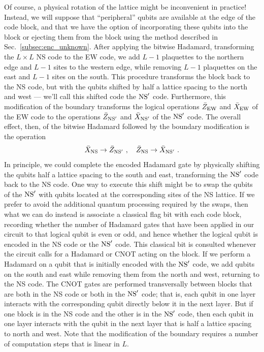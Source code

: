 Of course, a physical rotation of the lattice might be inconvenient in practice! Instead, we will  suppose that ``peripheral'' qubits are available at the edge of the code block, and that we have the option of incorporating these qubits into the block or ejecting them from the block using the  method described in Sec.~\ref{subsec:enc_unknown}. After applying the bitwise Hadamard, transforming the $L\times L$ NS code to the EW code, we add $L-1$ plaquettes to the northern edge and $L-1$ sites to the western edge, while removing $L-1$ plaquettes on the east and $L-1$ sites on the south. This procedure transforms the block back to the NS code, but with the qubits shifted by half a lattice spacing to the north and west --- we'll call this shifted code the ${\rm NS}'$ code. Furthermore, this modification of the boundary transforms the logical operations $\bar Z_{\rm EW}$ and $\bar X_{\rm EW}$ of the EW code to the operations $\bar Z_{{\rm NS}'}$ and $\bar X_{{\rm NS}'}$ of the ${\rm NS}'$ code. The overall effect, then, of the bitwise Hadamard followed by the boundary modification is the operation
\begin{equation}
\bar X_{\rm NS}\to \bar Z_{{\rm NS}'}~,\quad  \bar Z_{\rm NS}\to \bar X_{{\rm NS}'}~.
\end{equation}
In principle, we could complete the encoded Hadamard gate by physically shifting the qubits half a lattice spacing to the south and east, transforming the ${\rm NS}'$ code back to the NS code. One way to execute this shift might be to swap the qubits of the ${\rm NS}'$ with qubits located at the corresponding sites of the NS lattice. If we prefer to avoid the additional quantum processing required by the swaps, then what we can do instead is associate a classical flag bit with each code block, recording whether the number of Hadamard gates that have been applied in our circuit to that logical qubit is even or odd, and hence whether the logical qubit is encoded in the NS code or the ${\rm NS}'$ code. This classical bit is consulted whenever the circuit calls for a Hadamard or CNOT acting on the block. 
If we perform a Hadamard on a qubit that is initially encoded with the ${\rm NS}'$ code, we add qubits on the south and east while removing them from the north and west, returning to the NS code. The CNOT gates are performed transversally between blocks that are both in the NS code or both in the ${\rm NS}'$ code; that is, each qubit in one layer interacts with the corresponding qubit directly below it in the next layer. But if one block is in the NS code and the other is in the ${\rm NS}'$ code, then each qubit in one layer interacts with the qubit in the next layer that is half a lattice spacing to north and west. Note that the modification of the boundary requires a number of computation steps that is linear in $L$. 

